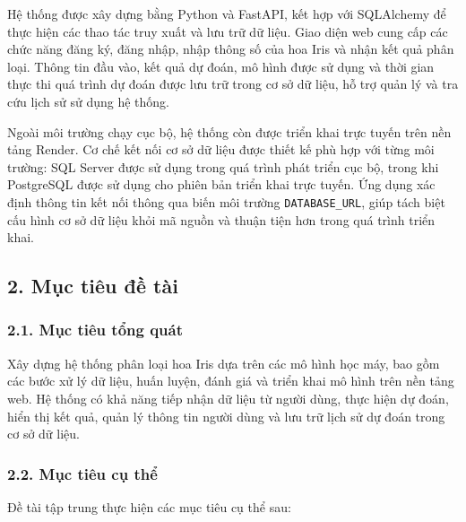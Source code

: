 \documentclass[14pt]{extarticle}
\begin{document}
\noindent Hệ thống được xây dựng bằng Python và FastAPI, kết hợp với SQLAlchemy để thực hiện các thao tác truy xuất và lưu trữ dữ liệu. Giao diện web cung cấp các chức năng đăng ký, đăng nhập, nhập thông số của hoa Iris và nhận kết quả phân loại. Thông tin đầu vào, kết quả dự đoán, mô hình được sử dụng và thời gian thực thi quá trình dự đoán được lưu trữ trong cơ sở dữ liệu, hỗ trợ quản lý và tra cứu lịch sử sử dụng hệ thống.

\noindent Ngoài môi trường chạy cục bộ, hệ thống còn được triển khai trực tuyến trên nền tảng Render. Cơ chế kết nối cơ sở dữ liệu được thiết kế phù hợp với từng môi trường: SQL Server được sử dụng trong quá trình phát triển cục bộ, trong khi PostgreSQL được sử dụng cho phiên bản triển khai trực tuyến. Ứng dụng xác định thông tin kết nối thông qua biến môi trường \texttt{DATABASE\_URL}, giúp tách biệt cấu hình cơ sở dữ liệu khỏi mã nguồn và thuận tiện hơn trong quá trình triển khai.
	
\subsection*{2. Mục tiêu đề tài}

\subsubsection*{2.1. Mục tiêu tổng quát}

\noindent Xây dựng hệ thống phân loại hoa Iris dựa trên các mô hình học máy, bao gồm các bước xử lý dữ liệu, huấn luyện, đánh giá và triển khai mô hình trên nền tảng web. Hệ thống có khả năng tiếp nhận dữ liệu từ người dùng, thực hiện dự đoán, hiển thị kết quả, quản lý thông tin người dùng và lưu trữ lịch sử dự đoán trong cơ sở dữ liệu.

\subsubsection*{2.2. Mục tiêu cụ thể}

\noindent Đề tài tập trung thực hiện các mục tiêu cụ thể sau:
\end{document}
